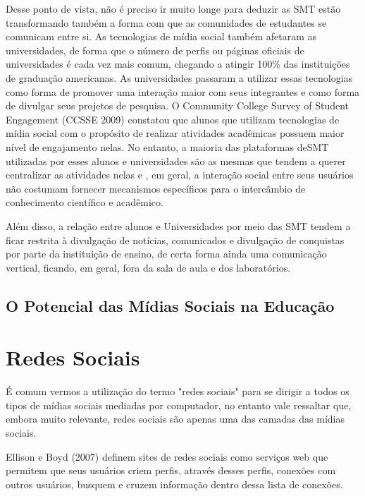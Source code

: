 Desse ponto de vista, não é preciso ir muito longe para deduzir as SMT estão
transformando também a forma com que as comunidades de estudantes se comunicam
entre si. As tecnologias de mídia social também afetaram as universidades, de
forma que o número de perfis ou páginas oficiais de universidades é cada vez mais
comum, chegando a atingir 100\% das instituições de graduação americanas. As
universidades passaram a utilizar essas tecnologias como forma de promover uma
interação maior com seus integrantes e como forma de divulgar seus projetos de
pesquisa. O Community College Survey of Student Engagement (CCSSE 2009) constatou
que alunos que utilizam tecnologias de mídia social com o propósito de realizar
atividades acadêmicas possuem maior nível de engajamento nelas. No entanto, a
maioria das plataformas deSMT utilizadas por esses alunos e universidades são as
mesmas que tendem a querer centralizar as atividades nelas e , em geral, a interação
social entre seus usuários não costumam fornecer mecanismos específicos para o
intercâmbio de conhecimento científico e acadêmico.

Além disso, a relação entre alunos e Universidades por meio das SMT tendem a ficar
restrita à divulgação de notícias, comunicados e divulgação de conquistas por parte
da instituição de ensino, de certa forma ainda uma comunicação vertical, ficando,
em geral, fora da sala de aula e dos laboratórios.

\subsection{O Potencial das Mídias Sociais na Educação}


\section{Redes Sociais}

É comum vermos a utilização do termo "redes sociais" para se dirigir a todos os
tipos de mídias sociais mediadas por computador, no entanto vale ressaltar que,
embora muito relevante, redes sociais são apenas uma das camadas das mídias sociais.

Ellison e Boyd (2007) \cite{beer2008} definem sites de redes sociais como
serviços web que permitem que seus usuários criem perfis, através desses perfis,
conexões com outros usuários, busquem e cruzem informação dentro dessa lista de
conexões.

